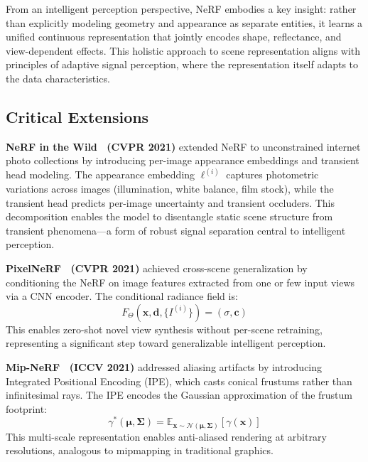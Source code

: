 \documentclass[journal]{IEEEtran}
\begin{document}
From an intelligent perception perspective, NeRF embodies a key insight: rather than explicitly modeling geometry and appearance as separate entities, it learns a unified continuous representation that jointly encodes shape, reflectance, and view-dependent effects. This holistic approach to scene representation aligns with principles of adaptive signal perception, where the representation itself adapts to the data characteristics.

\subsection{Critical Extensions}

\textbf{NeRF in the Wild~\cite{nerfw} (CVPR 2021)} extended NeRF to unconstrained internet photo collections by introducing per-image appearance embeddings and transient head modeling. The appearance embedding $\ell^{(i)}$ captures photometric variations across images (illumination, white balance, film stock), while the transient head predicts per-image uncertainty and transient occluders. This decomposition enables the model to disentangle static scene structure from transient phenomena---a form of robust signal separation central to intelligent perception.

\textbf{PixelNeRF~\cite{pixelnerf} (CVPR 2021)} achieved cross-scene generalization by conditioning the NeRF on image features extracted from one or few input views via a CNN encoder. The conditional radiance field is:
\begin{equation}
F_{\Theta}(\mathbf{x}, \mathbf{d}, \{I^{(i)}\}) = (\sigma, \mathbf{c})
\end{equation}
This enables zero-shot novel view synthesis without per-scene retraining, representing a significant step toward generalizable intelligent perception.

\textbf{Mip-NeRF~\cite{mipnerf} (ICCV 2021)} addressed aliasing artifacts by introducing Integrated Positional Encoding (IPE), which casts conical frustums rather than infinitesimal rays. The IPE encodes the Gaussian approximation of the frustum footprint:
\begin{equation}
\gamma^*(\boldsymbol{\mu}, \boldsymbol{\Sigma}) = \mathbb{E}_{\mathbf{x} \sim \mathcal{N}(\boldsymbol{\mu}, \boldsymbol{\Sigma})}[\gamma(\mathbf{x})]
\end{equation}
This multi-scale representation enables anti-aliased rendering at arbitrary resolutions, analogous to mipmapping in traditional graphics.
\end{document}
